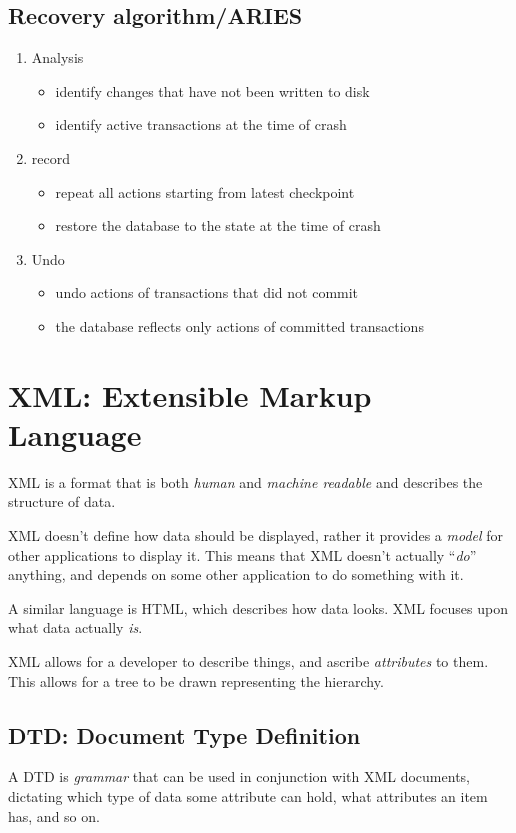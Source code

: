 \documentclass{article}
\begin{document}
\subsection{Recovery algorithm/ARIES}
\begin{enumerate}
  \item Analysis \begin{itemize}
          \item identify changes that have not been written to disk
          \item identify active transactions at the time of crash
        \end{itemize}
  \item record \begin{itemize}
          \item repeat all actions starting from latest checkpoint
          \item restore the database to the state at the time of crash
        \end{itemize}
  \item Undo \begin{itemize}
          \item undo actions of transactions that did not commit
          \item the database reflects only actions of committed transactions
        \end{itemize}
\end{enumerate}

\section{XML: Extensible Markup Language}

XML is a format that is both \textit{human} and \textit{machine readable} and describes the structure of data.

XML doesn't define how data should be displayed, rather it provides a \textit{model} for other applications to display it. This means that XML doesn't actually ``\textit{do}'' anything, and depends on some other application to do something with it.

A similar language is HTML, which describes how data looks. XML focuses upon what data actually \textit{is}.

XML allows for a developer to describe things, and ascribe \textit{attributes} to them. This allows for a tree to be drawn representing the hierarchy.

\subsection{DTD: Document Type Definition}

A DTD is \textit{grammar} that can be used in conjunction with XML documents, dictating which type of data some attribute can hold, what attributes an item has, and so on.
\end{document}
